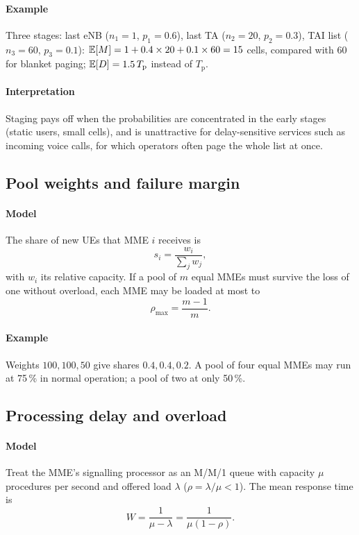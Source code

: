 \documentclass[11pt,a4paper]{article}
\begin{document}
\paragraph{Example} Three stages: last eNB ($n_1 = 1$, $p_1 = 0.6$), last TA ($n_2 = 20$, $p_2 = 0.3$),
TAI list ($n_3 = 60$, $p_3 = 0.1$): $\mathbb{E}[M] = 1 + 0.4\times20 + 0.1\times60 = 15$ cells, compared with 60
for blanket paging; $\mathbb{E}[D] = 1.5\,T_\mathrm{p}$ instead of $T_\mathrm{p}$.
\paragraph{Interpretation} Staging pays off when the probabilities are concentrated in the early stages
(static users, small cells), and is unattractive for delay-sensitive services such as incoming voice
calls, for which operators often page the whole list at once.

\subsection{Pool weights and failure margin}\label{sec:pool}
\paragraph{Model} The share of new UEs that MME $i$ receives is
\begin{equation}\label{eq:weight}
  s_i = \frac{w_i}{\sum_j w_j},
\end{equation}
with $w_i$ its relative capacity. If a pool of $m$ equal MMEs must survive the loss of one without
overload, each MME may be loaded at most to
\begin{equation}\label{eq:pool}
  \rho_{\max} = \frac{m-1}{m}.
\end{equation}
\paragraph{Example} Weights $100, 100, 50$ give shares $0.4, 0.4, 0.2$. A pool of four equal MMEs may run
at 75\,\% in normal operation; a pool of two at only 50\,\%.

\subsection{Processing delay and overload}\label{sec:mm1}
\paragraph{Model} Treat the MME's signalling processor as an M/M/1 queue with capacity $\mu$ procedures per
second and offered load $\lambda$ ($\rho = \lambda/\mu < 1$). The mean response time is
\begin{equation}\label{eq:mm1}
  W = \frac{1}{\mu-\lambda} = \frac{1}{\mu(1-\rho)} .
\end{equation}
\end{document}
